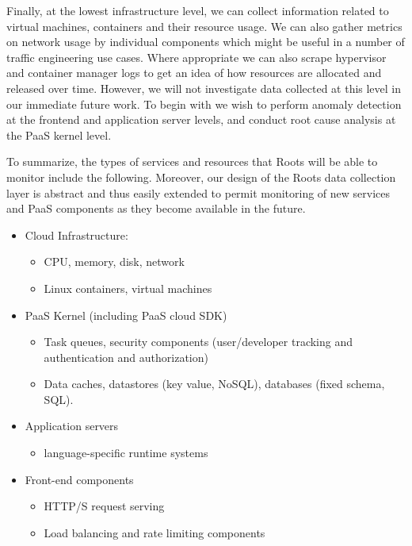 Finally, at the lowest infrastructure level, we can collect information related to virtual machines, containers
and their resource usage. We can also gather metrics on network usage by individual components which
might be useful in a number of traffic engineering use cases. Where appropriate we can also scrape
hypervisor and container manager logs to get an idea of how resources are allocated and released over
time. However, we will not investigate data collected at this level in our immediate future work.
To begin with we wish to perform anomaly detection at the frontend and application server levels, and conduct
root cause analysis at the PaaS kernel level.

To summarize, the types of services and resources that Roots will be able
to monitor include the following. Moreover, our design of the Roots data collection 
layer is abstract and thus easily extended to permit monitoring of new services 
and PaaS components as they become available in the future.
\begin{itemize}
\item Cloud Infrastructure: 
  \begin{itemize}
  \item CPU, memory, disk, network
  \item Linux containers, virtual machines
  \end{itemize}
\item PaaS Kernel (including PaaS cloud SDK)
  \begin{itemize}
  \item Task queues, security components (user/developer tracking and authentication and authorization)
  \item Data caches, datastores (key value, NoSQL), databases (fixed schema, SQL).
  \end{itemize}
\item Application servers
  \begin{itemize}
  \item language-specific runtime systems
  \end{itemize}
\item Front-end components
  \begin{itemize}
  \item HTTP/S request serving 
  \item Load balancing and rate limiting components
  \end{itemize}
\end{itemize}

